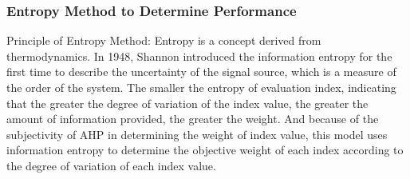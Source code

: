 \documentclass{mcmthesis}
\begin{document}
\subsubsection{Entropy Method to Determine Performance}
\par Principle of Entropy Method: Entropy is a concept derived from thermodynamics. In 1948, Shannon introduced the information entropy for the first time to describe the uncertainty of the signal source, which is a measure of the order of the system. The smaller the entropy of evaluation index, indicating that the greater the degree of variation of the index value, the greater the amount of information provided, the greater the weight. And because of the subjectivity of AHP in determining the weight of index value, this model uses information entropy to determine the objective weight of each index according to the degree of variation of each index value.
\end{document}
